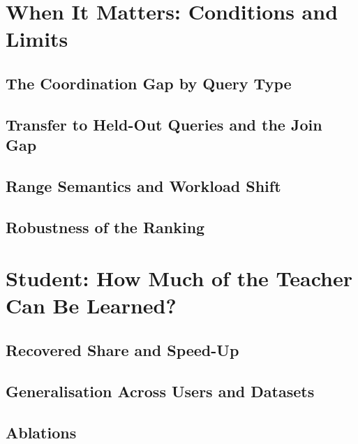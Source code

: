 \documentclass[conference]{IEEEtran}
\begin{document}
\section{When It Matters: Conditions and Limits}
\label{sec:when-matters}

\subsection{The Coordination Gap by Query Type}
\label{sec:coordination-gap}

\subsection{Transfer to Held-Out Queries and the Join Gap}
\label{sec:transfer}

\subsection{Range Semantics and Workload Shift}
\label{sec:shift}

\subsection{Robustness of the Ranking}
\label{sec:ranking-robustness}

\section{Student: How Much of the Teacher Can Be Learned?}
\label{sec:student-results}

\subsection{Recovered Share and Speed-Up}
\label{sec:recovered-share}

\subsection{Generalisation Across Users and Datasets}
\label{sec:student-generalisation}

\subsection{Ablations}
\label{sec:student-ablations}
\end{document}
